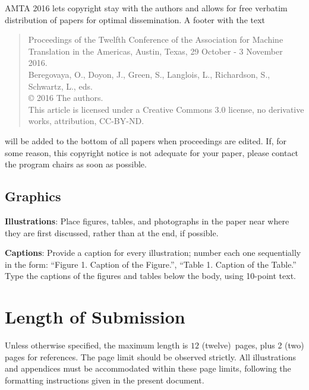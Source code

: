 \documentclass[]{article}
\newcommand{\confname}{AMTA 2016}
\newcommand{\paperlength}{$12$ (twelve)}
\newcommand{\shortpaperlength}{$6$ (six)}
\begin{document}
\confname{} lets copyright stay with the authors and allows for free verbatim distribution of papers for optimal dissemination. A footer with the text
\begin{quote}
\begin{small}
\begin{it}
  Proceedings of the Twelfth Conference of the Association for Machine Translation in the Americas, Austin, Texas, 29 October - 3 November 2016.\\
  Beregovaya, O., Doyon, J., Green, S., Langlois, L., Richardson, S., Schwartz, L., eds.\\
  \copyright{} 2016 The authors.\\
  This article is licensed under a Creative Commons 3.0 license, no derivative works, attribution, CC-BY-ND.
\end{it}
\end{small}
\end{quote}
will be added to the bottom of all papers when proceedings are
edited. If, for some reason, this copyright notice is not adequate for
your paper, please contact the program chairs as soon as possible. 

\subsection{Graphics}

{\bf Illustrations}: Place figures, tables, and photo\-graphs in the
paper near where they are first discussed, rather than at the end, if
possible.

{\bf Captions}: Provide a caption for every illustration; number
each one sequentially in the form:  ``Figure 1. Caption of the
Figure.'', ``Table 1. Caption of the Table.''  Type the captions of
the figures and tables below the body, using 10-point text.

\section{Length of Submission}
\label{sec:length}

Unless otherwise specified, the maximum length is \paperlength~pages,
plus 2 (two) pages for references. 
The page limit should be observed strictly. All illustrations and
appendices must be accommodated within these page limits, following
the formatting instructions given in the present document.

\small



\end{document}
